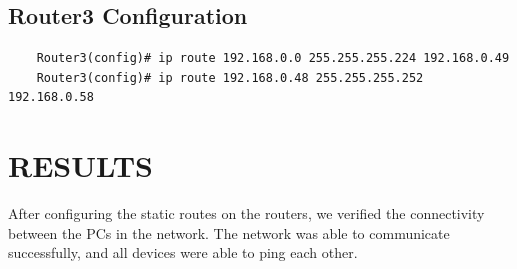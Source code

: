 \documentclass[a4paper,12pt]{article}
\begin{document}
\subsection*{Router3 Configuration}
\begin{verbatim}
    Router3(config)# ip route 192.168.0.0 255.255.255.224 192.168.0.49
    Router3(config)# ip route 192.168.0.48 255.255.255.252 192.168.0.58
\end{verbatim}



\section*{RESULTS}
After configuring the static routes on the routers, we verified the connectivity between the PCs in the network. The network was able to communicate successfully, and all devices were able to ping each other.
\end{document}
